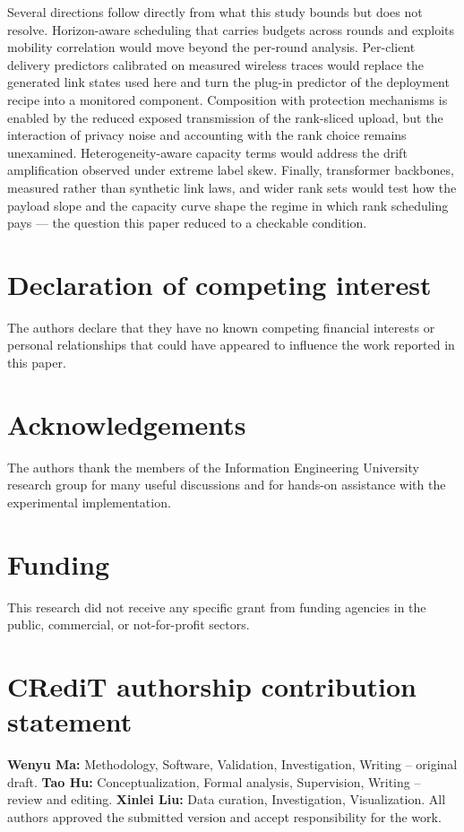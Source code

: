 \documentclass[a4paper,fleqn]{cas-dc}
\begin{document}
Several directions follow directly from what this study bounds but does not resolve. Horizon-aware scheduling that carries budgets across rounds and exploits mobility correlation would move beyond the per-round analysis. Per-client delivery predictors calibrated on measured wireless traces would replace the generated link states used here and turn the plug-in predictor of the deployment recipe into a monitored component. Composition with protection mechanisms is enabled by the reduced exposed transmission of the rank-sliced upload, but the interaction of privacy noise and accounting with the rank choice remains unexamined. Heterogeneity-aware capacity terms would address the drift amplification observed under extreme label skew. Finally, transformer backbones, measured rather than synthetic link laws, and wider rank sets would test how the payload slope and the capacity curve shape the regime in which rank scheduling pays --- the question this paper reduced to a checkable condition.

\section*{Declaration of competing interest}
The authors declare that they have no known competing financial interests or personal relationships that could have appeared to influence the work reported in this paper.

\section*{Acknowledgements}
The authors thank the members of the Information Engineering University research group for many useful discussions and for hands-on assistance with the experimental implementation.

\section*{Funding}
This research did not receive any specific grant from funding agencies in the public, commercial, or not-for-profit sectors.

\section*{CRediT authorship contribution statement}
\textbf{Wenyu Ma:} Methodology, Software, Validation, Investigation, Writing -- original draft.
\textbf{Tao Hu:} Conceptualization, Formal analysis, Supervision, Writing -- review and editing.
\textbf{Xinlei Liu:} Data curation, Investigation, Visualization.
All authors approved the submitted version and accept responsibility for the work.
\end{document}
